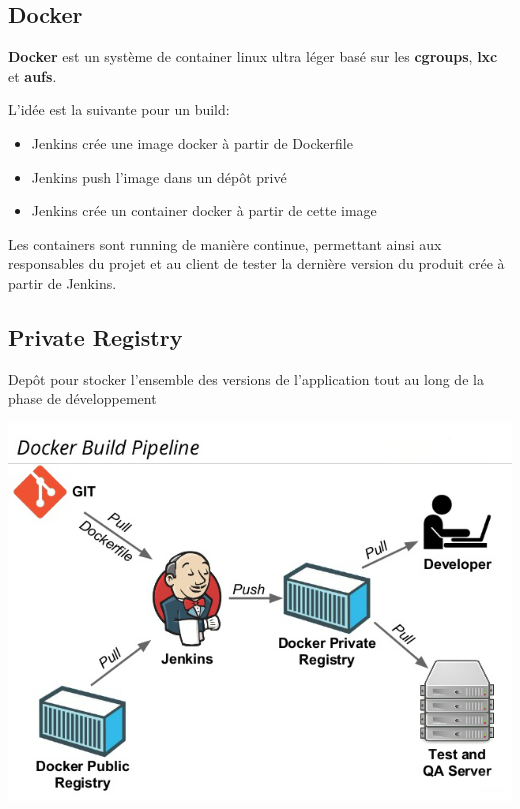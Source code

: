 \documentclass [a4paper,11pt]{article}
\begin{document}
\subsection{Docker}

\textbf{Docker} est un système de container linux ultra léger basé sur les \textbf{cgroups}, \textbf{lxc} et \textbf{aufs}.\newline

L'idée est la suivante pour un build:\newline

\begin{itemize}
 \item Jenkins crée une image docker à partir de Dockerfile
 \item Jenkins push l'image dans un dépôt privé
 \item Jenkins crée un container docker à partir de cette image\newline
\end{itemize}

Les containers sont running de manière continue, permettant ainsi aux responsables du projet et au client de tester la dernière version du produit crée à partir de Jenkins.

\subsection{Private Registry}

Depôt pour stocker l'ensemble des versions de l'application tout au long de la phase de développement

\begin{center}
\includegraphics[scale=0.4]{img/registry.png}
\end{center}
\end{document}
